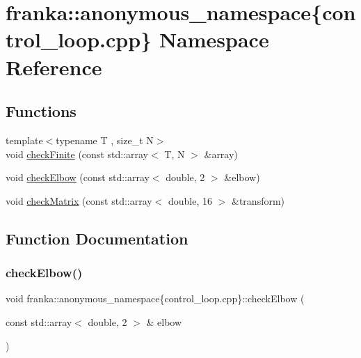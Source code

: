 \hypertarget{namespacefranka_1_1anonymous__namespace_02control__loop_8cpp_03}{}\section{franka\+:\+:anonymous\+\_\+namespace\{control\+\_\+loop.\+cpp\} Namespace Reference}
\label{namespacefranka_1_1anonymous__namespace_02control__loop_8cpp_03}
\subsection*{Functions}
\begin{DoxyCompactItemize}
\item 
{\footnotesize template$<$typename T , size\+\_\+t N$>$ }\\void \hyperlink{namespacefranka_1_1anonymous__namespace_02control__loop_8cpp_03_af284e9c97573a00e6fc31f0c716d6add}{check\+Finite} (const std\+::array$<$ T, N $>$ \&array)
\item 
void \hyperlink{namespacefranka_1_1anonymous__namespace_02control__loop_8cpp_03_a36007bd7eb2c55ea2c41d6bdad9c5abc}{check\+Elbow} (const std\+::array$<$ double, 2 $>$ \&elbow)
\item 
void \hyperlink{namespacefranka_1_1anonymous__namespace_02control__loop_8cpp_03_aff0fa7aeeb1c7339b142b323b30b1146}{check\+Matrix} (const std\+::array$<$ double, 16 $>$ \&transform)
\end{DoxyCompactItemize}


\subsection{Function Documentation}
\mbox{\label{namespacefranka_1_1anonymous__namespace_02control__loop_8cpp_03_a36007bd7eb2c55ea2c41d6bdad9c5abc}} 
\subsubsection{\texorpdfstring{check\+Elbow()}{checkElbow()}}
{\footnotesize\ttfamily void franka\+::anonymous\+\_\+namespace\{control\+\_\+loop.\+cpp\}\+::check\+Elbow (\begin{DoxyParamCaption}\item[{const std\+::array$<$ double, 2 $>$ \&}]{elbow }\end{DoxyParamCaption})\hspace{0.3cm}{\ttfamily [inline]}}



